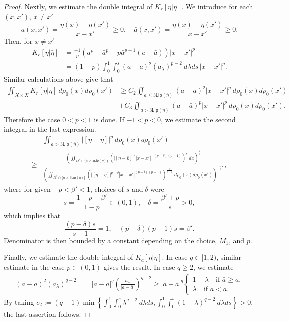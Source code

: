 \documentclass[10pt, letterpaper]{article}
\def\Lip{{\textsf{Lip}}}
\def\drr{{d\rho_0(x)d\rho_0(x')}}
\theoremstyle{definition}
\theoremstyle{remark}
\begin{document}
\begin{proof}
 
Nextly, we estimate the double integral of $K_r[\eta|\bar\eta]$. We introduce for each $(x,x')$, $x\ne x'$
$$ a(x,x') = \frac{\eta(x) - \eta(x')}{x-x'} \ge0, \quad \bar{a}(x,x') = \frac{\bar\eta(x) - \bar\eta(x')}{x-x'} \ge0.$$
Then, for $x\ne x'$
\begin{align*}
K_r[\eta|\bar\eta] &=\frac{-1}{p}\left(a^p - \bar a^p - p\bar a^{p-1}(a-\bar a)\right)|x-x'|^p \\
&= (1-p) \int_0^1 \int_0^s (a-\bar a)^2(a_\lambda)^{p-2} \: d\lambda ds\, |x-x'|^p.
\end{align*}
Similar calculations above give that
\begin{align*}
 \iint_{X\times X} K_r[\eta|\bar\eta]\:\drr
 &\ge C_2 \iint_{a \le 3\Lip(\bar\eta)} (a-\bar a)^2 |x-x'|^{p} \: \drr\\
 & + C_3 \iint_{a > 3\Lip(\bar\eta)} (a-\bar a)^p |x-x'|^p \: \drr.
\end{align*}
Therefore the case $0<p<1$ is done. If $-1<p<0$, we estimate the second integral in the last expression. 
\begin{align*}
&\iint_{a > 3\Lip(\bar\eta)} \big| [\eta - \bar\eta]\big|^p \: \drr\\
\ge &\frac{\left(\iint_{\Omega^2\cap \{ a >3\Lip(\bar\eta)\}} \left(\big|[\eta - \bar\eta]\big|^\delta |x-x'|^{-(p-\delta)(p-1)}\right)^s \:dx \right)^{\frac{1}{s}}}{\left(\iint_{\Omega^2 \cap \{a>3\Lip(\bar\eta)\}} \left(\big|[\eta - \bar\eta]\big|^{p-\delta}|x-x'|^{(p-\delta)(p-1)}\right)^{ \frac{s}{s-1}} \: \drr \right)^{\frac{1-s}{s}}},
\end{align*}
where for given $-p<\beta' <1$, choices of $s$ and $\delta$ were
$$ s = \frac{1-p-\beta'}{1-p} \in (0,1), \quad \delta  = \frac{\beta' + p}{s} >0,$$%
which implies that
$$ \frac{(p-\delta)s}{s-1} = 1, \quad (p-\delta)(p-1)s = \beta'.$$%
Denominator is then bounded by a constant depending on the choice, $M_1$, and $p$.

Finally, we estimate the double integral of $K_a[\eta|\bar\eta]$. In case $q \in [1,2)$, similar estimate in the case $p\in(0,1)$ gives the result. In case $q \ge 2$, we estimate
\begin{align*}
 (a-\bar a)^2 (a_\lambda)^{q-2} &= |a-\bar a|^q \left(\frac{a_\lambda}{|a-\bar a|}\right)^{q-2} \ge |a-\bar a|^q\left\{
 \begin{aligned}
  1-\lambda \quad \text{if $\bar a \ge a$,}\\
  \lambda \quad \text{if $\bar a < a$}.
 \end{aligned}\right.
\end{align*}
By taking $\displaystyle c_2:= (q-1)\min\left\{ \int_0^1\int_0^s \lambda^{q-2} \:d\lambda ds, \int_0^1\int_0^s (1-\lambda)^{q-2} \:d\lambda ds\right\} >0$, the last assertion follows.
\end{proof}
\end{document}
